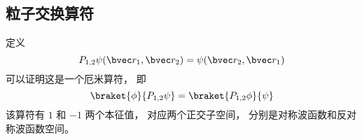 
\subsection{粒子交换算符}

定义
\begin{equation}
P_{1,2}\psi(\bvec r_1, \bvec r_2) = \psi(\bvec r_2, \bvec r_1)
\end{equation}
可以证明这是一个厄米算符， 即
\begin{equation}
\braket{\phi}{P_{1,2}\psi} = \braket{P_{1,2}\phi}{\psi}
\end{equation}
该算符有 $1$ 和 $-1$ 两个本征值， 对应两个正交子空间， 分别是对称波函数和反对称波函数空间。

